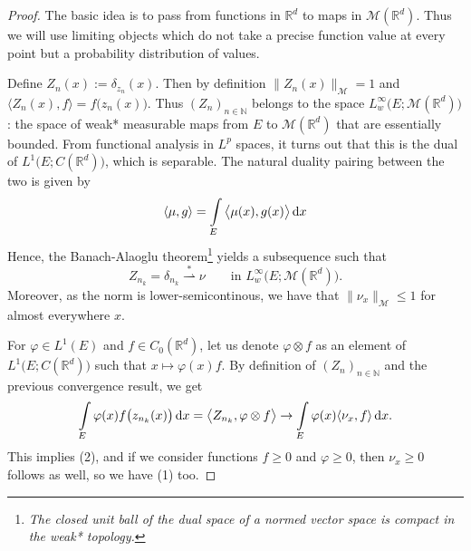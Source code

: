 \documentclass[a4paper,doc,11pt]{article}
\newtheorem{example}[theorem]{Example}
\newcommand{\R}{\mathbb{R}}
\newcommand{\N}{\mathbb{N}}
\begin{document}

\begin{proof}
    The basic idea is to pass from functions in \(\R^d\) to maps in \(\mathcal{M}(\R^d)\). Thus we will use limiting objects which do not take a precise function value at every point but a probability distribution of values.
    
    Define \(Z_{n}(x) := \delta_{z_n} (x)\). Then by definition \( \|Z_n(x)\|_{\mathcal{M}} = 1 \) and \(\langle Z_n(x), f\rangle = f\big(z_n(x)\big)\). Thus \( (Z_n)_{n\in\N}\) belongs to the space \(L^\infty_w\big( E; \mathcal{M}(\R^d) \big)\): the space of weak* measurable maps from \(E\) to \(\mathcal{M}(\R^d)\) that are essentially bounded. From functional analysis in \(L^p\) spaces, it turns out that this is the dual of \(L^1 \big( E; C(\R^d) \big)\), which is separable. The natural duality pairing between the two is given by
    \[
        \langle \mu, g \rangle = \int\limits_E \big\langle \mu(x), g(x) \big\rangle \dif x
    \]
    Hence, the Banach-Alaoglu theorem\footnote{\emph{The closed unit ball of the dual space of a normed vector space is compact in the weak* topology.}} yields a subsequence such that
    \[
        Z_{n_k} = \delta_{n_k} \overset{*}\rightharpoonup \nu 
        \qquad\text{in } L^\infty_w\big( E; \mathcal{M}(\R^d) \big).
    \]
    Moreover, as the norm is lower-semicontinous, we have that \(\|\nu_x\|_\mathcal{M} \leq 1\) for almost everywhere \(x\). 
    
    For \(\varphi \in L^1(E)\) and \(f\in C_0(\R^d)\), let us denote \( \varphi \otimes f \) as an element of \(L^1 \big( E; C(\R^d) \big)\) such that \( x \mapsto \varphi(x) f\). By definition of \((Z_n)_{n\in \N}\) and the previous convergence result, we get
    \[
        \int\limits_E \varphi(x) f\big( z_{n_k}(x) \big) \dif x
        = \big\langle Z_{n_k}, \varphi \otimes f \big\rangle
        \to
        \int\limits_E \varphi(x) \langle \nu_x, f\rangle \dif x.
    \]
    This implies (2), and if we consider functions \( f\geq 0\) and \(\varphi \geq 0\), then \( \nu_x\geq 0\) follows as well, so we have (1) too.
    

\end{proof}
\end{document}
